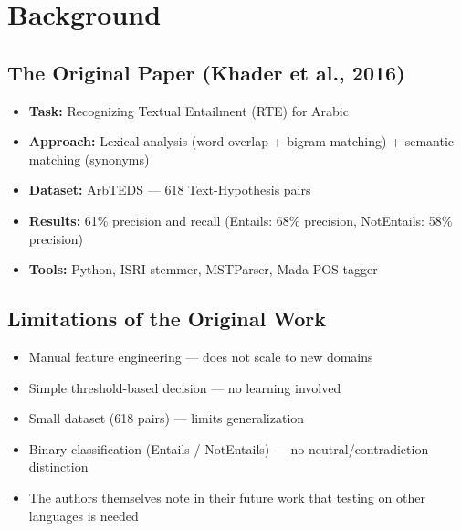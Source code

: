 \section{Background}

\subsection{The Original Paper (Khader et al., 2016)}

\begin{itemize}[nosep]
    \item \textbf{Task:} Recognizing Textual Entailment (RTE) for Arabic
    \item \textbf{Approach:} Lexical analysis (word overlap + bigram matching) + semantic matching (synonyms)
    \item \textbf{Dataset:} ArbTEDS --- 618 Text-Hypothesis pairs
    \item \textbf{Results:} 61\% precision and recall (Entails: 68\% precision, NotEntails: 58\% precision)
    \item \textbf{Tools:} Python, ISRI stemmer, MSTParser, Mada POS tagger
\end{itemize}

\subsection{Limitations of the Original Work}

\begin{itemize}[nosep]
    \item Manual feature engineering --- does not scale to new domains
    \item Simple threshold-based decision --- no learning involved
    \item Small dataset (618 pairs) --- limits generalization
    \item Binary classification (Entails / NotEntails) --- no neutral/contradiction distinction
    \item The authors themselves note in their future work that testing on other languages is needed
\end{itemize}
